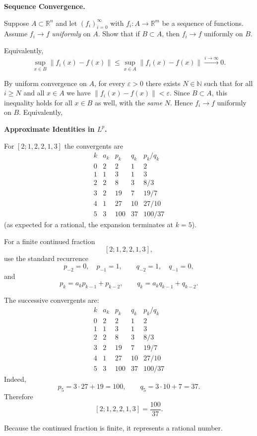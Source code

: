 \begin{problem}[CP-II-0200]
\label{prob:cp-ii-0200}
\textbf{Sequence Convergence.}

\hspace*{1.5em}Suppose $A\subset\mathbb{R}^n$ and let $(f_i)_{i=0}^\infty$ with $f_i:A\to\mathbb{R}^m$ be a sequence of functions.
Assume $f_i\to f$ \emph{uniformly} on $A$. Show that if $B\subset A$, then $f_i\to f$ uniformly on $B$.

\medskip Equivalently,
\[
\sup_{x\in B}\|f_i(x)-f(x)\|\le \sup_{x\in A}\|f_i(x)-f(x)\|\xrightarrow{i\to\infty} 0.
\]
\end{problem}

\begin{solution}
By uniform convergence on $A$, for every $\varepsilon>0$ there exists $N\in\mathbb{N}$ such that
for all $i\ge N$ and all $x\in A$ we have $\|f_i(x)-f(x)\|<\varepsilon$. Since $B\subset A$, this inequality holds
for all $x\in B$ as well, with the \emph{same} $N$. Hence $f_i\to f$ uniformly on $B$.  \medskip Equivalently,
\end{solution}

\begin{problem}[CP-II-0201]
\label{prob:cp-ii-0201}
\textbf{Approximate Identities in \(L^p\).}

\hspace*{1.5em}For $[2;1,2,2,1,3]$ the convergents are
	\[
	\begin{array}{c|c|c|c|c}
		k & a_k & p_k & q_k & p_k/q_k\\ \hline
		0 & 2 & 2  & 1  & 2 \\
		1 & 1 & 3  & 1  & 3 \\
		2 & 2 & 8  & 3  & 8/3 \\
		3 & 2 & 19 & 7  & 19/7 \\
		4 & 1 & 27 & 10 & 27/10 \\
		5 & 3 & 100& 37 & \boxed{100/37}
	\end{array}
	\]
	(as expected for a rational, the expansion terminates at $k=5$).
\end{problem}

\begin{solution}
For a finite continued fraction
\[
[2;1,2,2,1,3],
\]
use the standard recurrence
\[
p_{-2}=0,\quad p_{-1}=1,
\qquad
q_{-2}=1,\quad q_{-1}=0,
\]
and
\[
p_k=a_kp_{k-1}+p_{k-2},
\qquad
q_k=a_kq_{k-1}+q_{k-2}.
\]

The successive convergents are:
\[
\begin{array}{c|c|c|c|c}
k&a_k&p_k&q_k&p_k/q_k\\ \hline
0&2&2&1&2\\
1&1&3&1&3\\
2&2&8&3&8/3\\
3&2&19&7&19/7\\
4&1&27&10&27/10\\
5&3&100&37&100/37
\end{array}
\]
Indeed,
\[
p_5=3\cdot27+19=100,
\qquad
q_5=3\cdot10+7=37.
\]
Therefore
\[
\boxed{
[2;1,2,2,1,3]=\frac{100}{37}.
}
\]

Because the continued fraction is finite, it represents a rational number.
\end{solution}


